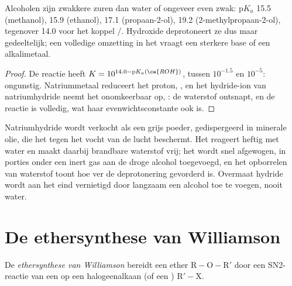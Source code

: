 \begin{proposition}\label{prop:b1:alcohol-activation:alcohol-acidity}
Alcoholen zijn zwakkere zuren dan water of ongeveer even zwak:
$\mathrm{p}K_a$ 15.5 (methanol), 15.9 (ethanol), 17.1 (propaan-2-ol),
19.2 (2-methylpropaan-2-ol), tegenover 14.0 voor het koppel
/. Hydroxide deprotoneert ze dus maar gedeeltelijk; een
volledige omzetting in het  vraagt een sterkere base of een
alkalimetaal.
\end{proposition}

\begin{proof}
De reactie  heeft $K = 10^{14.0 -
\mathrm{p}K_a(\ce{ROH})}$, tussen $10^{-1.5}$ en $10^{-5}$: ongunstig.
Natriummetaal reduceert het proton, ,
en het hydride-ion van natriumhydride neemt het onomkeerbaar op,
: de waterstof ontsnapt, en de reactie is
volledig, wat haar evenwichtsconstante ook is.
\end{proof}

\begin{inthelab}[Natriumhydride]
Natriumhydride wordt verkocht als een grijs poeder, gedispergeerd in
minerale olie, die het tegen het vocht van de lucht beschermt. Het
reageert heftig met water en maakt daarbij brandbare waterstof vrij; het
wordt snel afgewogen, in porties onder een inert gas aan de droge alcohol
toegevoegd, en het opborrelen van waterstof toont hoe ver de deprotonering
gevorderd is. Overmaat hydride wordt aan het eind vernietigd door langzaam
een alcohol toe te voegen, nooit water.
\end{inthelab}

\section{De ethersynthese van Williamson}

\begin{definition}\label{def:b1:alcohol-activation:williamson}
De \emph{ethersynthese van Williamson}
bereidt een ether $\mathrm{R{-}O{-}R'}$ door een SN2-reactie van een  
op een halogeenalkaan (of een ) $\mathrm{R'{-}X}$.
\end{definition}

